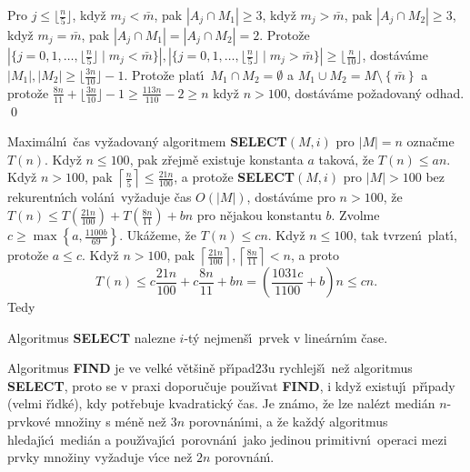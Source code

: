  Pro $j\le\lfloor\frac n5\rfloor$, kdy\v z $
m_j<\bar {m}$, pak 
$|A_j\cap M_1|\ge 3$, kdy\v z $m_j>\bar {m}$, pak $|A_j\cap M_2|\ge 
3$, kdy\v z $m_j=\bar {m}$, 
pak $|A_j\cap M_1|=|A_j\cap M_2|=2$.  Proto\v ze 
$|\{j=0,1,\dots,\lfloor\frac n5\rfloor\mid m_j<\bar {m}\}|,|\{j=0
,1,\dots,\lfloor\frac n5\rfloor\mid m_j>\bar {m}\}|\ge\lfloor\frac 
n{10}\rfloor$, 
dost\'av\'ame $|M_1|,|M_2|\ge\lfloor\frac {3n}{10}\rfloor -1$.  Proto\v ze plat\'\i\ $
M_1\cap M_2=\emptyset$ 
a $M_1\cup M_2=M\setminus \left\{\bar {m}\right\}$ a proto\v ze $\frac {8n}{
11}+\lfloor\frac {3n}{10}\rfloor -1\ge\frac {113n}{110}-2\ge n$ 
kdy\v z $n>100$, dost\'av\'ame po\v zadovan\'y odhad. \qed
\enddemo

\flushpar Maxim\'aln\'\i\ \v cas vy\v zadovan\'y algoritmem  
{\bf SELECT$\left(M,i\right)$} pro $|M|=n$ ozna\v cme $T\left(n\right)$.  Kdy\v z $n\le 
100$, pak z\v rejm\v e 
exis\-tuje konstanta $a$ takov\'a, \v ze $T\left(n\right)\le an$.  Kdy\v z $
n>100$, 
pak $\left\lceil\frac n5\right\rceil\le\frac {21n}{100}$, a proto\v ze {\bf SELECT$
\left(M,i\right)$} pro $|M|>100$ bez 
rekurentn\'\i ch vol\'an\'\i\ vy\v zaduje \v cas $O\left(|M|\right)$, dost\'av\'ame pro 
$n>100$, \v ze $T\left(n\right)\le T\left(\frac {21n}{100}\right)+T\left(\frac {8n}{11}\right)+bn$ pro n\v ejakou konstantu 
$b$.  Zvolme $c\ge\max\left\{a,\frac {1100b}{69}\right\}$. Uk\'a\v zeme, \v ze $
T\left(n\right)\le cn$.  
Kdy\v z $n\le 100$, tak tvrzen\'\i\ plat\'\i , proto\v ze $a\le c$.  Kdy\v z 
$n>100$, pak $\left\lceil\frac {21n}{100}\right\rceil ,\left\lceil\frac {8n}{11}\right\rceil 
<n$, a proto 
$$T\left(n\right)\le c\frac {21n}{100}+c\frac {8n}{11}+bn=\left(\frac {1031c}{110
0}+b\right)n\le cn.$$
Tedy
\medskip

Algoritmus {\bf SELECT} nalezne $i$-t\'y nejmen\v s\'\i\ 
prvek v line\'arn\'\i m \v case.
\endproclaim

\flushpar Algoritmus {\bf FIND} je ve velk\'e v\v et\v sin\v e 
p\v r\'\i pad\accent23u 
rychlej\v s\'\i\ ne\v z algoritmus {\bf SELECT}, proto se v praxi 
doporu\v cuje pou\v z\'\i vat {\bf FIND}, i kdy\v z existuj\'\i\ 
p\v r\'\i pady (velmi \v r\'\i dk\'e), kdy pot\v rebuje kvadratick\'y \v cas.
Je zn\'amo, \v ze lze nal\'ezt medi\'an $n$-prvkov\'e mno\v ziny s 
m\'en\v e ne\v z $3n$ porov\-n\'an\'\i mi, a \v ze ka\v zd\'y algoritmus hledaj\'\i c\'\i\ 
medi\'an a pou\v z\'\i vaj\'\i c\'\i\ porov\-n\'an\'\i\ jako jedinou primi\-tivn\'\i\ 
operaci mezi prvky mno\v ziny vy\v zaduje v\'\i ce ne\v z $2n$ 
porov\-n\'an\'\i .
\medskip

